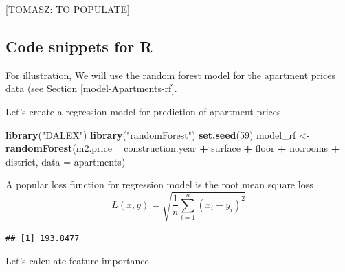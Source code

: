 \documentclass[12pt,]{krantz}
\newenvironment{Shaded}{\begin{snugshade}}{\end{snugshade}}
\newcommand{\DataTypeTok}[1]{\textcolor[rgb]{0.13,0.29,0.53}{#1}}
\newcommand{\DecValTok}[1]{\textcolor[rgb]{0.00,0.00,0.81}{#1}}
\newcommand{\KeywordTok}[1]{\textcolor[rgb]{0.13,0.29,0.53}{\textbf{#1}}}
\newcommand{\NormalTok}[1]{#1}
\newcommand{\OperatorTok}[1]{\textcolor[rgb]{0.81,0.36,0.00}{\textbf{#1}}}
\newcommand{\OtherTok}[1]{\textcolor[rgb]{0.56,0.35,0.01}{#1}}
\newcommand{\StringTok}[1]{\textcolor[rgb]{0.31,0.60,0.02}{#1}}
\begin{document}
{[}TOMASZ: TO POPULATE{]}

\hypertarget{featureImportanceR}{%
\subsection{Code snippets for R}\label{featureImportanceR}}

For illustration, We will use the random forest model for the apartment prices data (see Section \ref{model-Apartments-rf}.

Let's create a regression model for prediction of apartment prices.

\begin{Shaded}
\begin{Highlighting}[]
\KeywordTok{library}\NormalTok{(}\StringTok{"DALEX"}\NormalTok{)}
\KeywordTok{library}\NormalTok{(}\StringTok{"randomForest"}\NormalTok{)}
\KeywordTok{set.seed}\NormalTok{(}\DecValTok{59}\NormalTok{)}
\NormalTok{model_rf <-}\StringTok{ }\KeywordTok{randomForest}\NormalTok{(m2.price }\OperatorTok{~}\StringTok{ }\NormalTok{construction.year }\OperatorTok{+}\StringTok{ }\NormalTok{surface }\OperatorTok{+}\StringTok{ }\NormalTok{floor }\OperatorTok{+}\StringTok{ }
\StringTok{                           }\NormalTok{no.rooms }\OperatorTok{+}\StringTok{ }\NormalTok{district, }\DataTypeTok{data =}\NormalTok{ apartments)}
\end{Highlighting}
\end{Shaded}

A popular loss function for regression model is the root mean square loss
\[
  L(x, y) = \sqrt{\frac1n \sum_{i=1}^n (x_i - y_i)^2}
\]

\begin{Shaded}
\end{Shaded}

\begin{verbatim}
## [1] 193.8477
\end{verbatim}

Let's calculate feature importance

\begin{Shaded}
\end{Shaded}
\end{document}
